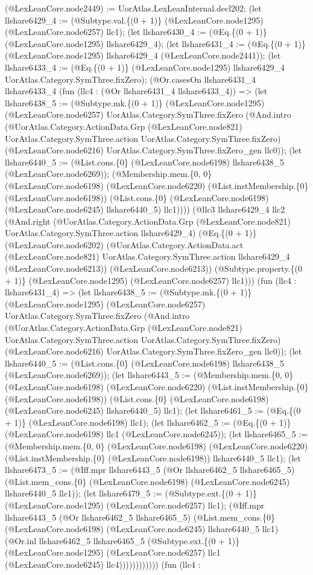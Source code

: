 \documentclass[11pt]{article}
\begin{document}
(@LexLeanCore.node2449) := UorAtlas.LexLeanInternal.decl202; (let llshare6429\_4 := (@Subtype.val.\{(0 + 1)\} (@LexLeanCore.node1295) (@LexLeanCore.node6257) llc1); (let llshare6430\_4 := (@Eq.\{(0 + 1)\} (@LexLeanCore.node1295) llshare6429\_4); (let llshare6431\_4 := (@Eq.\{(0 + 1)\} (@LexLeanCore.node1295) llshare6429\_4 (@LexLeanCore.node2441)); (let llshare6433\_4 := (@Eq.\{(0 + 1)\} (@LexLeanCore.node1295) llshare6429\_4 UorAtlas.Category.SymThree.fixZero); (@Or.casesOn llshare6431\_4 llshare6433\_4 (fun (llc4 : (@Or llshare6431\_4 llshare6433\_4)) => (let llshare6438\_5 := (@Subtype.mk.\{(0 + 1)\} (@LexLeanCore.node1295) (@LexLeanCore.node6257) UorAtlas.Category.SymThree.fixZero (@And.intro (@UorAtlas.Category.ActionData.Grp (@LexLeanCore.node821) UorAtlas.Category.SymThree.action UorAtlas.Category.SymThree.fixZero) (@LexLeanCore.node6216) UorAtlas.Category.SymThree.fixZero\_gen llc0)); (let llshare6440\_5 := (@List.cons.\{0\} (@LexLeanCore.node6198) llshare6438\_5 (@LexLeanCore.node6269)); (@Membership.mem.\{0, 0\} (@LexLeanCore.node6198) (@LexLeanCore.node6220) (@List.instMembership.\{0\} (@LexLeanCore.node6198)) (@List.cons.\{0\} (@LexLeanCore.node6198) (@LexLeanCore.node6245) llshare6440\_5) llc1)))) (@llc3 llshare6429\_4 llc2 (@And.right (@UorAtlas.Category.ActionData.Grp (@LexLeanCore.node821) UorAtlas.Category.SymThree.action llshare6429\_4) (@Eq.\{(0 + 1)\} (@LexLeanCore.node6202) (@UorAtlas.Category.ActionData.act (@LexLeanCore.node821) UorAtlas.Category.SymThree.action llshare6429\_4 (@LexLeanCore.node6213)) (@LexLeanCore.node6213)) (@Subtype.property.\{(0 + 1)\} (@LexLeanCore.node1295) (@LexLeanCore.node6257) llc1))) (fun (llc4 : llshare6431\_4) => (let llshare6438\_5 := (@Subtype.mk.\{(0 + 1)\} (@LexLeanCore.node1295) (@LexLeanCore.node6257) UorAtlas.Category.SymThree.fixZero (@And.intro (@UorAtlas.Category.ActionData.Grp (@LexLeanCore.node821) UorAtlas.Category.SymThree.action UorAtlas.Category.SymThree.fixZero) (@LexLeanCore.node6216) UorAtlas.Category.SymThree.fixZero\_gen llc0)); (let llshare6440\_5 := (@List.cons.\{0\} (@LexLeanCore.node6198) llshare6438\_5 (@LexLeanCore.node6269)); (let llshare6443\_5 := (@Membership.mem.\{0, 0\} (@LexLeanCore.node6198) (@LexLeanCore.node6220) (@List.instMembership.\{0\} (@LexLeanCore.node6198)) (@List.cons.\{0\} (@LexLeanCore.node6198) (@LexLeanCore.node6245) llshare6440\_5) llc1); (let llshare6461\_5 := (@Eq.\{(0 + 1)\} (@LexLeanCore.node6198) llc1); (let llshare6462\_5 := (@Eq.\{(0 + 1)\} (@LexLeanCore.node6198) llc1 (@LexLeanCore.node6245)); (let llshare6465\_5 := (@Membership.mem.\{0, 0\} (@LexLeanCore.node6198) (@LexLeanCore.node6220) (@List.instMembership.\{0\} (@LexLeanCore.node6198)) llshare6440\_5 llc1); (let llshare6473\_5 := (@Iff.mpr llshare6443\_5 (@Or llshare6462\_5 llshare6465\_5) (@List.mem\_cons.\{0\} (@LexLeanCore.node6198) (@LexLeanCore.node6245) llshare6440\_5 llc1)); (let llshare6479\_5 := (@Subtype.ext.\{(0 + 1)\} (@LexLeanCore.node1295) (@LexLeanCore.node6257) llc1); (@Iff.mpr llshare6443\_5 (@Or llshare6462\_5 llshare6465\_5) (@List.mem\_cons.\{0\} (@LexLeanCore.node6198) (@LexLeanCore.node6245) llshare6440\_5 llc1) (@Or.inl llshare6462\_5 llshare6465\_5 (@Subtype.ext.\{(0 + 1)\} (@LexLeanCore.node1295) (@LexLeanCore.node6257) llc1 (@LexLeanCore.node6245) llc4)))))))))))) (fun (llc4 : 
\end{document}
